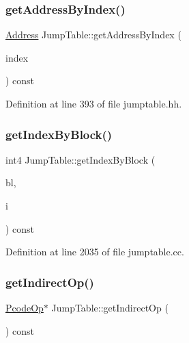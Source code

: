\subsubsection{\texorpdfstring{getAddressByIndex()}{getAddressByIndex()}}
{\footnotesize\ttfamily \mbox{\hyperlink{class_address}{Address}} Jump\+Table\+::get\+Address\+By\+Index (\begin{DoxyParamCaption}\item[{int4}]{index }\end{DoxyParamCaption}) const\hspace{0.3cm}{\ttfamily [inline]}}



Definition at line 393 of file jumptable.\+hh.

\mbox{\label{class_jump_table_abc8399a772fe0bd6bbcb94304af98d5b}} 
\subsubsection{\texorpdfstring{getIndexByBlock()}{getIndexByBlock()}}
{\footnotesize\ttfamily int4 Jump\+Table\+::get\+Index\+By\+Block (\begin{DoxyParamCaption}\item[{const \mbox{\hyperlink{class_flow_block}{Flow\+Block}} $\ast$}]{bl,  }\item[{int4}]{i }\end{DoxyParamCaption}) const}



Definition at line 2035 of file jumptable.\+cc.

\mbox{\label{class_jump_table_a0edd5fb3fed20b0f5b62b10eb45d7acf}} 
\subsubsection{\texorpdfstring{getIndirectOp()}{getIndirectOp()}}
{\footnotesize\ttfamily \mbox{\hyperlink{class_pcode_op}{Pcode\+Op}}$\ast$ Jump\+Table\+::get\+Indirect\+Op (\begin{DoxyParamCaption}\item[{void}]{ }\end{DoxyParamCaption}) const\hspace{0.3cm}{\ttfamily [inline]}}



